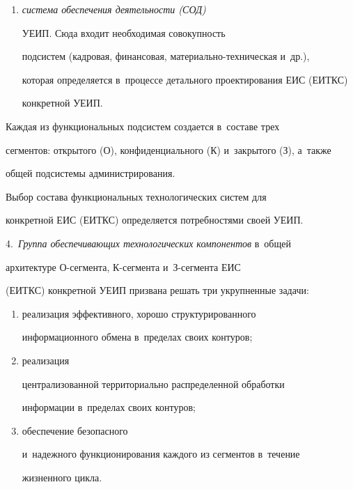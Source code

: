\begin{enumerate}[(1)]
необходимости выборочно~--- только назначенному контингенту из числа 

руководителей, сотрудников и~исполнителей, выполняющих свои 

непосредственные работы в~конкретной сфере деятельности;

     \item \textit{система обеспечения деятельности (СОД)}  

УЕИП. Сюда входит необходимая совокупность 

подсистем (кадровая, финансовая, ма\-те\-ри\-аль\-но-тех\-ни\-че\-ская и~др.), 

которая определяется в~процессе детального проектирования ЕИС (ЕИТКС) 

конкретной УЕИП.

     \end{enumerate}

     

     Каждая из функциональных подсистем создается в~составе трех 

сегментов: открытого (О), конфиденциального (К) и~закрытого (З), а~также 

общей подсистемы администрирования.

     

     Выбор состава функциональных технологических систем для 

конкретной ЕИС (ЕИТКС) определяется потребностями своей УЕИП.

     

     \smallskip

     

4.\ \textit{Группа обеспечивающих технологических компонентов} в~общей 

архитектуре О-сег\-мен\-та, К-сег\-мен\-та и~З-сег\-мен\-та ЕИС 

(ЕИТКС) конкретной УЕИП призвана решать три укрупненные задачи: 

\begin{enumerate}[(1)]

\item реализация эффективного, хорошо структурированного 

информационного обмена в~пределах своих контуров; 

\item  реализация 

централизованной территориально распределенной обработки 

информации в~пределах своих контуров;

\item  обеспечение безопасного 

и~надежного функционирования каждого из сегментов в~течение 

жизненного цикла.

\end{enumerate}



